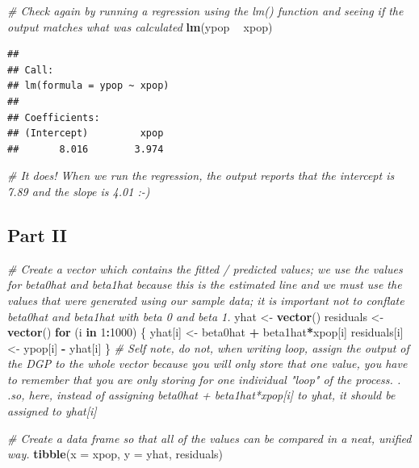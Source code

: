 \documentclass[]{article}
\newenvironment{Shaded}{\begin{snugshade}}{\end{snugshade}}
\newcommand{\KeywordTok}[1]{\textcolor[rgb]{0.13,0.29,0.53}{\textbf{#1}}}
\newcommand{\DataTypeTok}[1]{\textcolor[rgb]{0.13,0.29,0.53}{#1}}
\newcommand{\DecValTok}[1]{\textcolor[rgb]{0.00,0.00,0.81}{#1}}
\newcommand{\StringTok}[1]{\textcolor[rgb]{0.31,0.60,0.02}{#1}}
\newcommand{\CommentTok}[1]{\textcolor[rgb]{0.56,0.35,0.01}{\textit{#1}}}
\newcommand{\ControlFlowTok}[1]{\textcolor[rgb]{0.13,0.29,0.53}{\textbf{#1}}}
\newcommand{\OperatorTok}[1]{\textcolor[rgb]{0.81,0.36,0.00}{\textbf{#1}}}
\newcommand{\NormalTok}[1]{#1}
\begin{document}
\begin{Shaded}
\begin{Highlighting}[]
\CommentTok{# Check again by running a regression using the lm() function and seeing if the output matches what was calculated }
\KeywordTok{lm}\NormalTok{(ypop }\OperatorTok{~}\StringTok{ }\NormalTok{xpop)}
\end{Highlighting}
\end{Shaded}

\begin{verbatim}
## 
## Call:
## lm(formula = ypop ~ xpop)
## 
## Coefficients:
## (Intercept)         xpop  
##       8.016        3.974
\end{verbatim}

\begin{Shaded}
\begin{Highlighting}[]
\CommentTok{# It does! When we run the regression, the output reports that the intercept is 7.89 and the slope is 4.01 :-) }
\end{Highlighting}
\end{Shaded}

\subsection{Part II}\label{part-ii-2}

\begin{Shaded}
\begin{Highlighting}[]
\CommentTok{# Create a vector which contains the fitted / predicted values; we use the values for beta0hat and beta1hat because this is the estimated line and we must use the values that were generated using our sample data; it is important not to conflate beta0hat and beta1hat with beta 0 and beta 1. }
\NormalTok{yhat <-}\StringTok{ }\KeywordTok{vector}\NormalTok{()}
\NormalTok{residuals <-}\StringTok{ }\KeywordTok{vector}\NormalTok{()}
\ControlFlowTok{for}\NormalTok{ (i }\ControlFlowTok{in} \DecValTok{1}\OperatorTok{:}\DecValTok{1000}\NormalTok{) \{}
\NormalTok{  yhat[i] <-}\StringTok{ }\NormalTok{beta0hat }\OperatorTok{+}\StringTok{ }\NormalTok{beta1hat}\OperatorTok{*}\NormalTok{xpop[i]}
\NormalTok{  residuals[i] <-}\StringTok{ }\NormalTok{ypop[i] }\OperatorTok{-}\StringTok{ }\NormalTok{yhat[i] }
\NormalTok{\}}
\CommentTok{# Self note, do not, when writing loop, assign the output of the DGP to the whole vector because you will only store that one value, you have to remember that you are only storing for one individual "loop" of the process. . .so, here, instead of assigning beta0hat + beta1hat*xpop[i]  to yhat, it should be assigned to yhat[i]}

\CommentTok{# Create a data frame so that all of the values can be compared in a neat, unified way. }
\KeywordTok{tibble}\NormalTok{(}\DataTypeTok{x =}\NormalTok{ xpop, }\DataTypeTok{y =}\NormalTok{ yhat, residuals)}
\end{Highlighting}
\end{Shaded}
\end{document}

